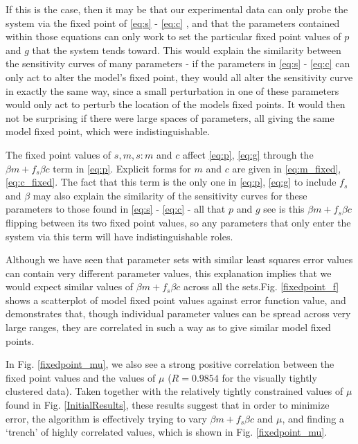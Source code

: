 \documentclass[10pt,journal]{./IEEE_latex_class/IEEEtran}
\begin{document}
If this is the case, then it may be that our experimental data can only probe the system via the fixed point of \eqref{eq:s} - \eqref{eq:c} , and that the parameters contained within those equations can only work to set the particular fixed point values of $p$ and $g$ that the system tends toward. This would explain the similarity between the sensitivity curves of many parameters - if the parameters in \eqref{eq:s} - \eqref{eq:c} can only act to alter the model's fixed point, they would all alter the sensitivity curve in exactly the same way, since a small perturbation in one of these parameters would only act to perturb the location of the models fixed points. It would then not be surprising if there were large spaces of parameters, all giving the same model fixed point, which were indistinguishable.

The fixed point values of $s,m, s:m$ and $c$ affect \eqref{eq:p}, \eqref{eq:g} through the $\beta m +f_{s}\beta c$ term in \eqref{eq:p}. Explicit forms for $m$ and $c$ are given in \eqref{eq:m_fixed}, \eqref{eq:c_fixed}. The fact that this term is  the only one in \eqref{eq:p}, \eqref{eq:g} to include $f_{s}$ and $\beta$ may also explain the similarity of the sensitivity curves for these parameters to those found in \eqref{eq:s} - \eqref{eq:c} - all that $p$ and $g$ see is this $\beta m +f_{s}\beta c$ flipping between its two fixed point values, so any parameters that only enter the system via this term will have indistinguishable roles.

Although we have seen that parameter sets with similar least squares error values can contain very different parameter values, this explanation implies that we would expect similar values of $\beta m +f_{s}\beta c$ across all the sets.Fig. \ref{fixedpoint_f} shows a scatterplot of model fixed point values against error function value, and demonstrates that, though individual parameter values can be spread across very large ranges, they are correlated in such a way as to give similar model fixed points. 

In Fig. \ref{fixedpoint_mu}, we also see a strong positive correlation between the fixed point values and the values of $\mu$ ($R = 0.9854$ for the visually tightly clustered data). Taken together with the relatively tightly constrained values of $\mu$ found in Fig. \ref{InitialResults}, these results suggest that in order to minimize error, the algorithm is effectively trying to vary $\beta m +f_{s}\beta c$ and $\mu$, and finding a `trench' of highly correlated values, which is shown in Fig. \ref{fixedpoint_mu}. 
\end{document}

